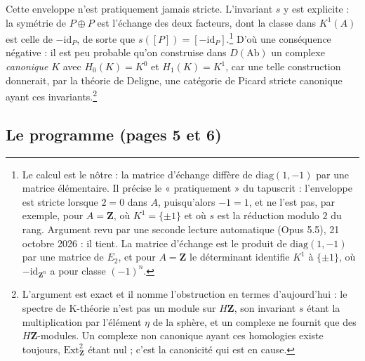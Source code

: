 \documentclass[11pt,a4paper]{article}
\begin{document}
Cette enveloppe n'est pratiquement jamais stricte. L'invariant $s$ y est
explicite : la symétrie de $P \oplus P$ est l'échange des deux facteurs, dont
la classe dans $K^1(A)$ est celle de $-\mathrm{id}_P$, de sorte que
$s([P]) = [-\mathrm{id}_P]$.\footnote{Le calcul est le nôtre : la matrice
d'échange diffère de $\mathrm{diag}(1,-1)$ par une matrice élémentaire. Il
précise le « pratiquement » du tapuscrit : l'enveloppe est stricte lorsque
$2 = 0$ dans $A$, puisqu'alors $-1 = 1$, et ne l'est pas, par exemple, pour
$A = \mathbf{Z}$, où $K^1 = \{\pm 1\}$ et où $s$ est la réduction modulo $2$ du rang. Argument revu par une seconde lecture automatique (Opus 5.5), 21 octobre 2026 : il tient. La matrice d'échange est le produit de $\mathrm{diag}(1,-1)$ par une matrice de $E_2$, et pour $A = \mathbf{Z}$ le déterminant identifie $K^1$ à $\{\pm 1\}$, où $-\mathrm{id}_{\mathbf{Z}^n}$ a pour classe $(-1)^n$.} D'où une conséquence négative : il est peu probable qu'on construise
dans $D(\mathrm{Ab})$ un complexe \emph{canonique} $K$ avec
$H_0(K) = K^0$ et $H_1(K) = K^1$, car une telle construction donnerait, par
la théorie de Deligne, une catégorie de Picard stricte canonique ayant ces
invariants.\footnote{L'argument est exact et il nomme l'obstruction en
termes d'aujourd'hui : le spectre de K-théorie n'est pas un module sur
$H\mathbf{Z}$, son invariant $s$ étant la multiplication par l'élément
$\eta$ de la sphère, et un complexe ne fournit que des
$H\mathbf{Z}$-modules. Un complexe non canonique ayant ces homologies existe
toujours, $\mathrm{Ext}^2_{\mathbf{Z}}$ étant nul ; c'est la canonicité qui
est en cause.}

\subsection*{Le programme (pages 5 et 6)}
\end{document}
